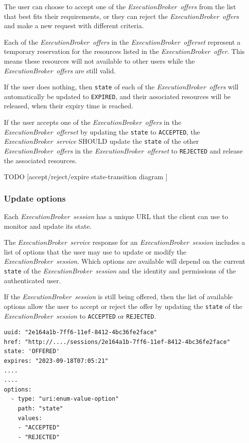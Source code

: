 \documentclass[11pt,a4paper]{ivoa}
\newcommand{\execbrokerservice}[1] {\textit{ExecutionBroker~service#1}}
\newcommand{\execoffer}[1] {\textit{ExecutionBroker~offer#1}}
\newcommand{\execofferset}[1] {\textit{ExecutionBroker~offerset#1}}
\newcommand{\execsession}[1] {\textit{ExecutionBroker~session#1}}
\newcommand{\codeword}[1] {\texttt{#1}}
\begin{document}
The user can choose to accept one of the \execoffer{s} from the list that best
fits their requirements, or they can reject the \execoffer{s} and make a new
request with different criteria.

Each of the \execoffer{s} in the \execofferset{} represent a temporary reservation
for the resources listed in the \execoffer{}.
This means these resources will not available to other users while the \execoffer{s}
are still valid.

If the user does nothing, then \codeword{state} of each of the \execoffer{s} will
automatically be updated to \codeword{EXPIRED}, and their associated resources will
be released, when their expiry time is reached.

If the user accepts one of the \execoffer{s} in the \execofferset{} by updating
the \codeword{state} to \codeword{ACCEPTED}, the \execbrokerservice{} SHOULD
update the \codeword{state} of the other \execoffer{s} in the \execofferset{} to
\codeword{REJECTED} and release the associated resources.

TODO [accept/reject/expire state-transition diagram ]

\subsubsection{Update options}
\label{update-options}

Each \execsession{} has a unique URL that the client can use to monitor and update
its state.

The \execbrokerservice{} response for an \execsession{} includes a list of options
that the user may use to update or modify the \execsession{}.
Which options are available will depend on the current \codeword{state} of the
\execsession{} and the identity and permissions of the authenticated user.

If the \execsession{} is still being offered, then the list of available options
allow the user to accept or reject the offer by updating the \codeword{state} of
the \execsession{} to \codeword{ACCEPTED} or \codeword{REJECTED}.

\begin{lstlisting}[]
uuid: "2e164a1b-7ff6-11ef-8412-4bc36fe2face"
href: "http://..../sessions/2e164a1b-7ff6-11ef-8412-4bc36fe2face"
state: 'OFFERED'
expires: "2023-09-18T07:05:21"
....
....
options:
  - type: "uri:enum-value-option"
    path: "state"
    values:
    - "ACCEPTED"
    - "REJECTED"
\end{lstlisting}
\end{document}
